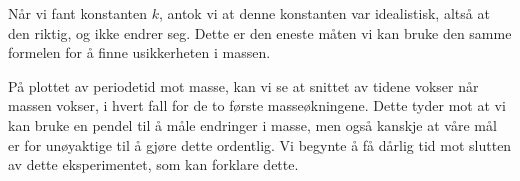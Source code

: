 Når vi fant konstanten $k$, antok vi at denne konstanten var idealistisk, altså at den riktig, og ikke endrer seg. Dette er den eneste måten vi kan bruke den samme formelen for å finne usikkerheten i massen. \smallskip

På plottet av periodetid mot masse, kan vi se at snittet av tidene vokser når massen vokser, i hvert fall for de to første masseøkningene. Dette tyder mot at vi kan bruke en pendel til å måle endringer i masse, men også kanskje at våre mål er for unøyaktige til å gjøre dette ordentlig. Vi begynte å få dårlig tid mot slutten av dette eksperimentet, som kan forklare dette.
